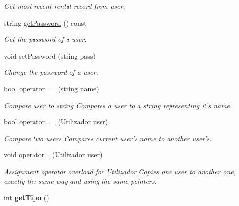 \begin{DoxyCompactItemize}
\begin{DoxyCompactList}\small\item\em Get most recent rental record from user. \end{DoxyCompactList}\item 
string \hyperlink{class_utilizador_a8be0d01c3f23383c25596bd1c73918e4}{get\+Password} () const 
\begin{DoxyCompactList}\small\item\em Get the password of a user. \end{DoxyCompactList}\item 
void \hyperlink{class_utilizador_a14ffc9d7128ed6c99e7adc4f94315f56}{set\+Password} (string pass)
\begin{DoxyCompactList}\small\item\em Change the password of a user. \end{DoxyCompactList}\item 
bool \hyperlink{class_utilizador_a8d0083b685ee8023dd9bbf5b0372cb1d}{operator==} (string name)
\begin{DoxyCompactList}\small\item\em Compare user to string Compares a user to a string representing it's name. \end{DoxyCompactList}\item 
bool \hyperlink{class_utilizador_a668e5c9fd643f4e56dbdb2a6e1172bf5}{operator==} (\hyperlink{class_utilizador}{Utilizador} user)
\begin{DoxyCompactList}\small\item\em Compare two users Compares current user's name to another user's. \end{DoxyCompactList}\item 
void \hyperlink{class_utilizador_a0ceb8bbbe6766b2f83ed9130fbf0975f}{operator=} (\hyperlink{class_utilizador}{Utilizador} user)
\begin{DoxyCompactList}\small\item\em Assignment operator overload for \hyperlink{class_utilizador}{Utilizador} Copies one user to another one, exactly the same way and using the same pointers. \end{DoxyCompactList}\item 
\hypertarget{class_utilizador_a6282ddeeb794835afa4ce109ebb6b53a}{int {\bfseries get\+Tipo} ()}\label{class_utilizador_a6282ddeeb794835afa4ce109ebb6b53a}


\end{DoxyCompactItemize}
